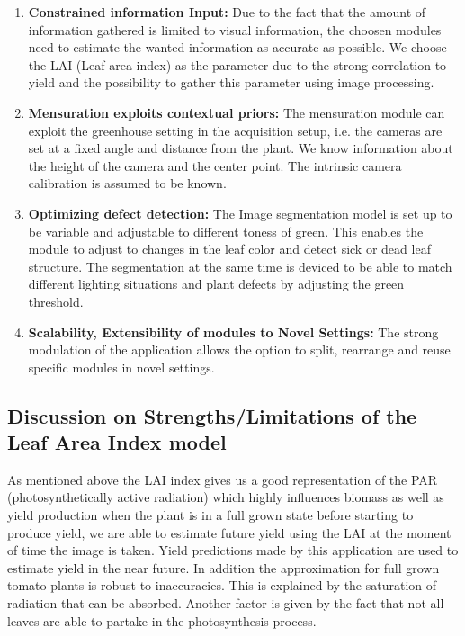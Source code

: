 \begin{enumerate}
    \item \textbf{Constrained information Input:} Due to the fact that the amount of information gathered is limited to visual information, the choosen modules need to estimate the wanted information as accurate as possible. We choose the LAI (Leaf area index) as the parameter due to the strong correlation to yield \cite{heuvelink2004effect} and the possibility to gather this parameter using image processing.

    \item \textbf{Mensuration exploits contextual priors:} The mensuration module can exploit the greenhouse setting in the acquisition setup, i.e. the cameras are set at a fixed angle and distance from the plant. We know information about the height of the camera and the center point. The intrinsic camera calibration is assumed to be known.

    \item \textbf{Optimizing defect detection:} The Image segmentation model is set up to be variable and adjustable to different toness of green. This enables the module to adjust to changes in the leaf color and detect sick or dead leaf structure. The segmentation at the same time is deviced to be able to match different lighting situations and plant defects by adjusting the green threshold.

    \item \textbf{Scalability, Extensibility of modules to Novel Settings:} The strong modulation of the application allows the option to split, rearrange and reuse specific modules in novel settings.
\end{enumerate}

\subsection{Discussion on Strengths/Limitations of the Leaf Area Index model}


As mentioned above the LAI index gives us a good representation of the PAR (photosynthetically active radiation) which highly influences biomass as well as yield production
\cite{hossain2017leaf} when the plant is in a full grown state before starting to produce yield, we are able to
estimate future yield using the LAI at the moment of time the image is taken. Yield predictions made by this
application are used to estimate yield in the near future. In addition the approximation for full grown tomato 
plants is robust to inaccuracies. This is explained by the saturation of radiation that can be absorbed.
Another factor is given by the fact that not all leaves are able to partake in the photosynthesis process.\\

